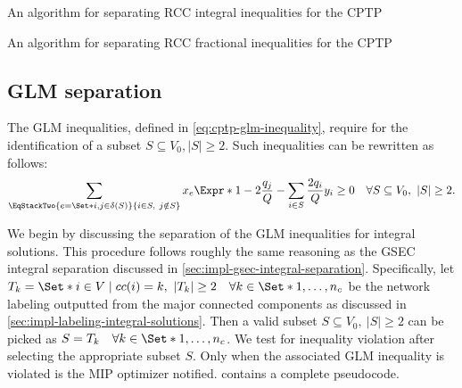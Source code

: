 \begin{algorithm}
	\caption{An algorithm for separating RCC integral inequalities for the CPTP}
	\label{algo:rcc-integral-sep}
	
\end{algorithm}

\begin{algorithm}
	\caption{An algorithm for separating RCC fractional inequalities for the CPTP}
	\label{algo:rcc-frac-sep}
	
\end{algorithm}

\subsection{GLM separation}
\label{sec:impl-glm-separation}

The GLM inequalities, defined in \cref{eq:cptp-glm-inequality},
require for the identification of a subset $S \subseteq V_0, |S| \ge 2$.
Such inequalities can be rewritten as follows:
\begin{equation}
	\sum\limits_{
		\EqStackTwo{e = \Set*{i,j} \in \delta(S)}{i \in S,\ j \notin S}
	} x_e \Expr*{1 - 2 \frac{q_j}{Q}}
	- \sum\limits_{i \in S} \frac{2 q_i}{Q} y_i
	\ge 0 \quad \forall S \subseteq V_0,\ |S| \ge 2
	.
\end{equation}

We begin by discussing the separation of the GLM inequalities for integral solutions.
This procedure follows roughly the same reasoning
as the GSEC integral separation discussed in \cref{sec:impl-gsec-integral-separation}.
Specifically, let $T_k  = \Set*{i \in V \mid cc(i) = k},\ |T_k| \ge 2 \quad \forall k \in \Set*{1, \dots, n_c}$
be the network labeling outputted from the major connected components as discussed in \cref{sec:impl-labeling-integral-solutions}.
Then a valid subset $S \subseteq V_0,\ |S| \ge 2$ can be picked as $S = T_k \quad \forall k \in \Set*{1, \dots, n_c}$.
We test for inequality violation after selecting the appropriate subset $S$.
Only when the associated GLM inequality is violated is the MIP optimizer notified.
 contains a complete pseudocode.

